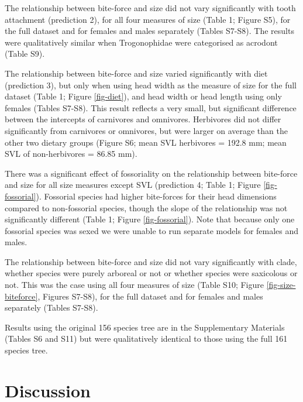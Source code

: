 \documentclass[a4paper, 12pt]{article}
\begin{document}
The relationship between bite-force and size did not vary significantly with tooth attachment (prediction 2), for all four measures of size (Table 1; Figure S5), for the full dataset and for females and males separately (Tables S7-S8). 
The results were qualitatively similar when Trogonophidae were categorised as acrodont (Table S9).

The relationship between bite-force and size varied significantly with diet (prediction 3), but only when using head width as the measure of size for the full dataset (Table 1; Figure \ref{fig-diet}), and head width or head length using only females (Tables S7-S8). 
This result reflects a very small, but significant difference between the intercepts of carnivores and omnivores. 
Herbivores did not differ significantly from carnivores or omnivores, but were larger on average than the other two dietary groups (Figure S6; mean SVL herbivores = 192.8 mm; mean SVL of non-herbivores = 86.85 mm).

There was a significant effect of fossoriality on the relationship between bite-force and size for all size measures except SVL (prediction 4; Table 1; Figure \ref{fig-fossorial}). 
Fossorial species had higher bite-forces for their head dimensions compared to non-fossorial species, though the slope of the relationship was not significantly different (Table 1; Figure \ref{fig-fossorial}). 
Note that because only one fossorial species was sexed we were unable to run separate models for females and males. 

The relationship between bite-force and size did not vary significantly with clade, whether species were purely arboreal or not or whether species were saxicolous or not. 
This was the case using all four measures of size (Table S10; Figure \ref{fig-size-biteforce}, Figures S7-S8), for the full dataset and for females and males separately (Tables S7-S8). 

Results using the original 156 species tree are in the Supplementary Materials (Tables S6 and S11) but were qualitatively identical to those using the full 161 species tree.


\section{Discussion}
\end{document}
